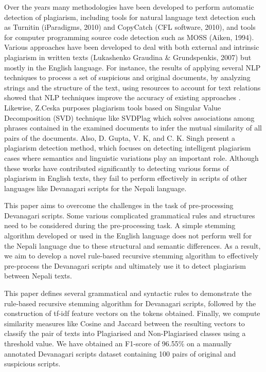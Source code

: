 \documentclass[conference]{IEEEtran}
\begin{document}
Over the years many methodologies have been developed to perform automatic detection of 
plagiarism, including tools for natural language text detection such as Turnitin (iParadigms, 2010)
and CopyCatch (CFL software, 2010), and tools for computer programming source code detection such as
MOSS (Aiken, 1994). Various approaches have been developed to deal with both external 
and intrinsic plagiarism in written texts (Lukashenko Graudina \& Grundspenkis, 2007) \cite{r3} 
but mostly in the English language. For instance, the results of applying
several NLP techniques to process a set of suspicious and original documents,
by analyzing strings and the structure of the text, using resources to account for text
relations showed that NLP techniques improve the accuracy of existing approaches 
\cite{r3}. Likewise, Z.Ceska \cite{r4} purposes plagiarism tools based on Singular Value 
Decomposition (SVD) technique like SVDPlag which solves associations among phrases 
contained in the examined documents to infer the mutual similarity of all pairs of the 
documents. Also,  D. Gupta, V. K, and C. K. Singh 
\cite{r5} present a plagiarism detection method, which focuses on detecting 
intelligent plagiarism cases where semantics and linguistic variations play an important role. 
Although these works have contributed significantly to detecting
various forms of plagiarism in English texts, they fail to perform effectively
in scripts of other languages like Devanagari scripts for the Nepali language.
  
This paper aims to overcome the challenges in the task of pre-processing Devanagari scripts. 
Some various complicated grammatical rules and structures need to be considered during the 
pre-processing task. A simple stemming algorithm developed or used in the English language
does not perform well for the Nepali language due to these structural and semantic differences. 
As a result, we aim to develop a novel rule-based recursive stemming algorithm to effectively pre-process the Devanagari scripts and ultimately use it to detect plagiarism between Nepali texts. 

This paper defines several grammatical and syntactic rules to demonstrate the 
rule-based recursive stemming algorithm for Devanagari scripts, followed by the construction
of tf-idf feature vectors on the tokens obtained. Finally, we compute similarity measures 
like Cosine and Jaccard between the resulting vectors to classify the pair of
texts into Plagiarised and Non-Plagiarised classes using a threshold value. We
have obtained an F1-score of 96.55\% on a manually annotated Devanagari
scripts dataset containing 100 pairs of original and suspicious scripts.
\end{document}
